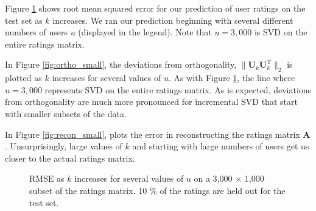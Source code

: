 \documentclass{article} %
\newcommand{\A}{\mathbf{A}}
\newcommand{\T}{\textrm{T}}
\begin{document}
Figure \ref{fig:error_small} shows root mean squared error for our prediction of user ratings on the test set as $k$ increases.
We ran our prediction beginning with several different numbers of 
users $u$ (displayed in the legend).
Note that $u = 3,000$ is SVD on the entire ratings matrix.

In Figure \ref{fig:ortho_small}, the deviations from orthogonality, 
$\|\mathbf{U}_k\mathbf{U}_k^{\T}\|_2$ is plotted as $k$ increases for several values of $u$. As with Figure \ref{fig:error_small}, the line where $u = 3,000$ represents SVD on the entire ratings matrix. As is expected, deviations from orthogonality are much more pronounced for incremental SVD that start with smaller subsets of the data.

In Figure \ref{fig:recon_small}, plots the error in reconstructing the ratings matrix $\A$.
Unsurprisingly, large values of $k$ and starting with large numbers
of users get us closer to the actual ratings matrix.


\begin{figure}[H]
\begin{center}
\end{center}
\caption{RMSE as $k$ increases for several values of $u$ on a 3,000 $\times$ 1,000 subset of the ratings matrix. 10 \% of the ratings are held out for the test set.}
\label{fig:error_small}
\end{figure}
\end{document}
